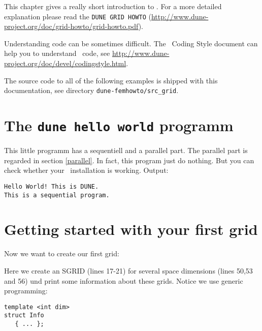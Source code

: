 This chapter gives a really short introduction to \Grid. For a more detailed explanation please read the \texttt{DUNE GRID HOWTO}
(\url{http://www.dune-project.org/doc/grid-howto/grid-howto.pdf}).

Understanding code can be sometimes difficult. The \Dune\ Coding Style document can help you to understand \Dune\ code, see 
\url{http://www.dune-project.org/doc/devel/codingstyle.html}.

The source code to all of the following examples is shipped with this documentation, see directory \lstinline!dune-femhowto/src_grid!.


\section{The \texttt{dune hello world} programm}
  \begin{lst} \label{lsthelloworld} \mbox{}
    
  \end{lst}

This little programm has a sequentiell and a parallel part. The parallel part is regarded in section \ref{parallel}. 
In fact, this program just do nothing. But you can check whether your \Dune\ installation is working. Output:
\begin{lstlisting}
Hello World! This is DUNE.
This is a sequential program.
\end{lstlisting}




\section{Getting started with your first grid}
Now we want to create our first grid:

  \begin{lst} \label{lstgettingstarted} \mbox{}
    
  \end{lst}

Here we create an SGRID (lines 17-21) for several space dimensions (lines 50,53 and 56) und print some information about these grids. 
Notice we use generic programming:
\begin{lstlisting}
template <int dim> 
struct Info 
   { ... };
\end{lstlisting}

